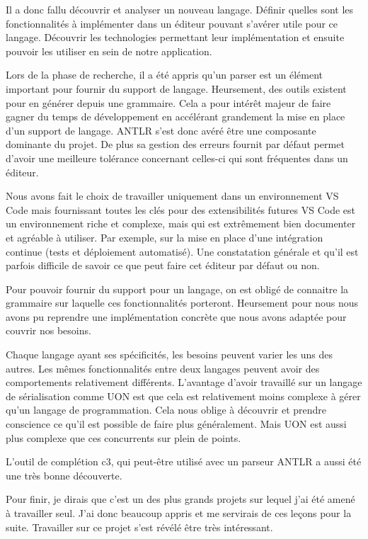 \documentclass[
    iict, %
    il, %
]{heig-tb}
\begin{document}
Il a donc fallu découvrir et analyser un nouveau langage.
Définir quelles sont les fonctionnalités à implémenter dans un éditeur pouvant s'avérer utile pour ce langage.
Découvrir les technologies permettant leur implémentation et ensuite pouvoir les utiliser en sein de notre application.

Lors de la phase de recherche, il a été appris qu'un parser est un élément important pour fournir du support de langage.
Heursement, des outils existent pour en générer depuis une grammaire. Cela a pour intérêt majeur de faire gagner du temps de développement en accélérant grandement la mise en place d'un support de langage.
ANTLR s'est donc avéré être une composante dominante du projet. De plus sa gestion des erreurs fournit par défaut permet d'avoir une meilleure tolérance concernant celles-ci
qui sont fréquentes dans un éditeur.

Nous avons fait le choix de travailler uniquement dans un environnement VS Code mais fournissant toutes les clés pour des extensibilités futures
VS Code est un environnement riche et complexe, mais qui est extrêmement bien documenter et agréable à utiliser.
Par exemple, sur la mise en place d'une intégration continue (tests et déploiement automatisé).
Une constatation générale et qu'il est parfois difficile de savoir ce que peut faire cet éditeur par défaut ou non.

Pour pouvoir fournir du support pour un langage, on est obligé de connaitre la grammaire sur laquelle ces fonctionnalités porteront.
Heursement pour nous nous avons pu reprendre une implémentation concrète que nous avons adaptée pour couvrir nos besoins.

Chaque langage ayant ses spécificités, les besoins peuvent varier les uns des autres.
Les mêmes fonctionnalités entre deux langages peuvent avoir des comportements relativement différents.
L'avantage d'avoir travaillé sur un langage de sérialisation comme UON est que cela est relativement moins complexe à gérer qu'un langage de programmation.
Cela nous oblige à découvrir et prendre conscience ce qu'il est possible de faire plus généralement.
Mais UON est aussi plus complexe que ces concurrents sur plein de points.

L'outil de complétion c3, qui peut-être utilisé avec un parseur ANTLR a aussi été une très bonne découverte.

Pour finir, je dirais que c'est un des plus grands projets sur lequel j'ai été amené à travailler seul.
J'ai donc beaucoup appris et me servirais de ces leçons pour la suite. Travailler sur ce projet s'est révélé être très intéressant.
\end{document}
